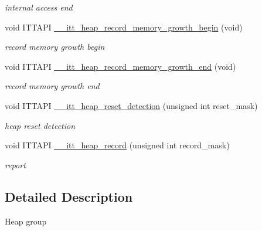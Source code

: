 \begin{DoxyCompactItemize}
\begin{DoxyCompactList}\small\item\em internal access end \end{DoxyCompactList}\item 
\hypertarget{group__heap_ga3e449ab4b9c0cab883f23f74e70db5fb}{}void I\+T\+T\+A\+P\+I \hyperlink{group__heap_ga3e449ab4b9c0cab883f23f74e70db5fb}{\+\_\+\+\_\+itt\+\_\+heap\+\_\+record\+\_\+memory\+\_\+growth\+\_\+begin} (void)\label{group__heap_ga3e449ab4b9c0cab883f23f74e70db5fb}

\begin{DoxyCompactList}\small\item\em record memory growth begin \end{DoxyCompactList}\item 
\hypertarget{group__heap_ga4127abefaf89ca2c2a76c70dc0d7e124}{}void I\+T\+T\+A\+P\+I \hyperlink{group__heap_ga4127abefaf89ca2c2a76c70dc0d7e124}{\+\_\+\+\_\+itt\+\_\+heap\+\_\+record\+\_\+memory\+\_\+growth\+\_\+end} (void)\label{group__heap_ga4127abefaf89ca2c2a76c70dc0d7e124}

\begin{DoxyCompactList}\small\item\em record memory growth end \end{DoxyCompactList}\item 
\hypertarget{group__heap_gae980b97cc0134229a27c1b6263def28c}{}void I\+T\+T\+A\+P\+I \hyperlink{group__heap_gae980b97cc0134229a27c1b6263def28c}{\+\_\+\+\_\+itt\+\_\+heap\+\_\+reset\+\_\+detection} (unsigned int reset\+\_\+mask)\label{group__heap_gae980b97cc0134229a27c1b6263def28c}

\begin{DoxyCompactList}\small\item\em heap reset detection \end{DoxyCompactList}\item 
\hypertarget{group__heap_ga8de33699cca1b37a8309d8047124174e}{}void I\+T\+T\+A\+P\+I \hyperlink{group__heap_ga8de33699cca1b37a8309d8047124174e}{\+\_\+\+\_\+itt\+\_\+heap\+\_\+record} (unsigned int record\+\_\+mask)\label{group__heap_ga8de33699cca1b37a8309d8047124174e}

\begin{DoxyCompactList}\small\item\em report \end{DoxyCompactList}\end{DoxyCompactItemize}


\subsection{Detailed Description}
Heap group 

